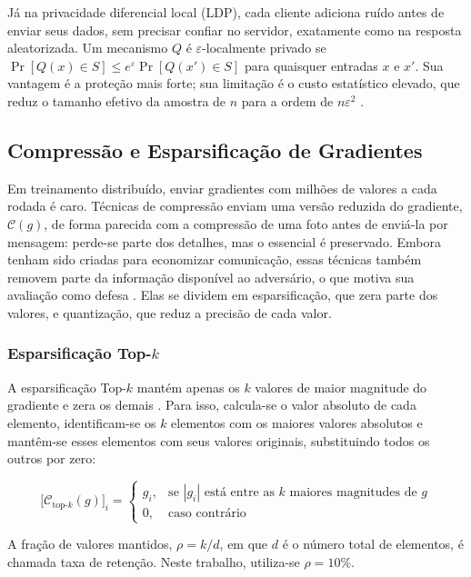 Já na privacidade diferencial local (LDP), cada cliente adiciona ruído antes de enviar seus dados, sem precisar confiar no servidor, exatamente como na resposta aleatorizada. Um mecanismo $Q$ é $\varepsilon$-localmente privado se $\Pr[Q(x) \in S] \leq e^{\varepsilon} \Pr[Q(x') \in S]$ para quaisquer entradas $x$ e $x'$. Sua vantagem é a proteção mais forte; sua limitação é o custo estatístico elevado, que reduz o tamanho efetivo da amostra de $n$ para a ordem de $n\varepsilon^2$ \cite{Duchi2013}.

\subsection{Compressão e Esparsificação de Gradientes} \label{sec:compressao}

Em treinamento distribuído, enviar gradientes com milhões de valores a cada rodada é caro. Técnicas de compressão enviam uma versão reduzida do gradiente, $\mathcal{C}(g)$, de forma parecida com a compressão de uma foto antes de enviá-la por mensagem: perde-se parte dos detalhes, mas o essencial é preservado. Embora tenham sido criadas para economizar comunicação, essas técnicas também removem parte da informação disponível ao adversário, o que motiva sua avaliação como defesa \cite{Zhu2019}. Elas se dividem em esparsificação, que zera parte dos valores, e quantização, que reduz a precisão de cada valor.

\subsubsection{Esparsificação Top-$k$}

A esparsificação Top-$k$ mantém apenas os $k$ valores de maior magnitude do gradiente e zera os demais \cite{Stich2018}. Para isso, calcula-se o valor absoluto de cada elemento, identificam-se os $k$ elementos com os maiores valores absolutos e mantêm-se esses elementos com seus valores originais, substituindo todos os outros por zero:

\begin{equation} \label{eq:topk}
\big[\mathcal{C}_{\text{top-}k}(g)\big]_i =
\begin{cases}
g_i, & \text{se } |g_i| \text{ está entre as } k \text{ maiores magnitudes de } g \\
0, & \text{caso contrário}
\end{cases}
\end{equation}

A fração de valores mantidos, $\rho = k/d$, em que $d$ é o número total de elementos, é chamada taxa de retenção. Neste trabalho, utiliza-se $\rho = 10\%$.

